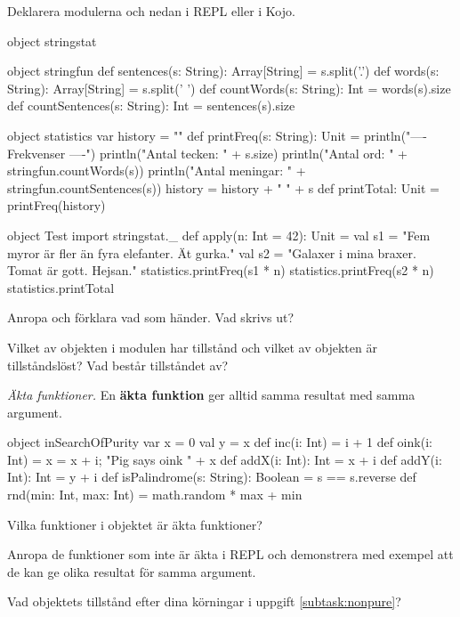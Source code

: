 \Subtask Deklarera modulerna  och  nedan i REPL eller i Kojo. 

\begin{Code}
object stringstat {
  object stringfun {
    def sentences(s: String): Array[String] = s.split('.')
    def words(s: String): Array[String] = s.split(' ')
    def countWords(s: String): Int = words(s).size
    def countSentences(s: String): Int = sentences(s).size
  }
  
  object statistics {
    var history = ""
    def printFreq(s: String): Unit = {
      println("\n---- Frekvenser ----")
      println("Antal tecken:   " + s.size)
      println("Antal ord:      " + stringfun.countWords(s))
      println("Antal meningar: " + stringfun.countSentences(s))
      history = history + " " + s
    }
    def printTotal: Unit = printFreq(history)
  }
}
  
object Test {
  import stringstat._
  def apply(n: Int = 42): Unit = {
    val s1 = "Fem myror är fler än fyra elefanter. Ät gurka."
    val s2 = "Galaxer i mina braxer. Tomat är gott. Hejsan."
    statistics.printFreq(s1 * n)
    statistics.printFreq(s2 * n)
    statistics.printTotal
  }
}
\end{Code}

\Subtask Anropa  och förklara vad som händer. Vad skrivs ut?

\Subtask Vilket av objekten i modulen  har tillstånd och vilket av objekten är tillståndslöst? Vad består tillståndet av?


\Task \emph{Äkta funktioner.} En \textbf{äkta funktion} ger alltid samma resultat med samma argument.  

\begin{Code}
object inSearchOfPurity {
  var x = 0
  val y = x
  def inc(i: Int) = i + 1
  def oink(i: Int) = {x = x + i; "Pig says oink " + x}
  def addX(i: Int): Int = x + i
  def addY(i: Int): Int = y + i
  def isPalindrome(s: String): Boolean = s == s.reverse
  def rnd(min: Int, max: Int) = math.random * max + min
}
\end{Code}

\Subtask\Pen Vilka funktioner i objektet  är äkta funktioner?

\Subtask \label{subtask:nonpure} Anropa de funktioner som inte är äkta i REPL och demonstrera med exempel att de kan ge olika resultat för samma argument.

\Subtask Vad objektets tillstånd efter dina körningar i uppgift \ref{subtask:nonpure}? 


